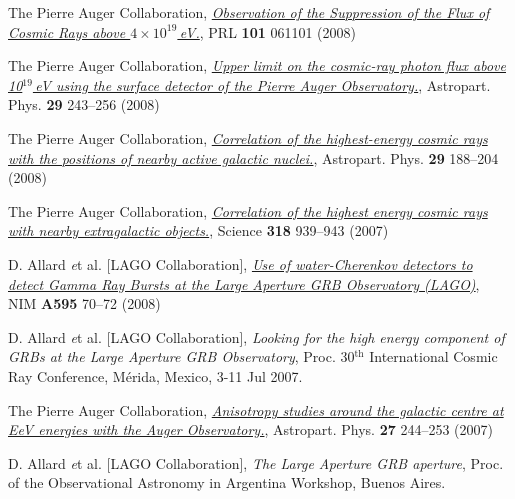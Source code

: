 \begin{etaremune}
\item {}The Pierre Auger Collaboration,
\href{http://dx.doi.org/10.1103/PhysRevLett.101.061101}{\emph{Observation of
the Suppression of the Flux of Cosmic Rays above $4\times10^{19}$\,eV.}}, PRL
{\bf 101} 061101 (2008)

\item {}The Pierre Auger Collaboration,
\href{http://dx.doi.org/10.1016/j.astropartphys.2008.01.003}{\emph{Upper limit
on the cosmic-ray photon flux above 10$^{19}$\,eV using the surface detector of
the Pierre Auger Observatory.}}, Astropart. Phys. {\bf 29} 243--256 (2008)

\item {}The Pierre Auger Collaboration,
\href{http://dx.doi.org/10.1016/j.astropartphys.2008.01.002}{\emph{Correlation
of the highest-energy cosmic rays with the positions of nearby active galactic
nuclei.}}, Astropart. Phys. {\bf 29} 188--204 (2008)

\item {}The Pierre Auger Collaboration,
\href{http://dx.doi.org/10.1126/science.1151124}{\emph{Correlation of the
highest energy cosmic rays with nearby extragalactic objects.}}, Science {\bf
318} 939--943 (2007)

\item {}D. Allard {\emph et al.} [LAGO Collaboration],
\href{http://dx.doi.org/10.1016/j.nima.2008.07.041}{\emph{Use of
water-Cherenkov detectors to detect Gamma Ray Bursts at the Large Aperture GRB
Observatory (LAGO)}}, NIM {\bf A595} 70--72 (2008)

\item {}D. Allard {\emph et al.} [LAGO Collaboration], {\emph{Looking for
the high energy component of GRBs at the Large Aperture GRB Observatory}}, \en
Proc. 30$^{\mathrm{th}}$ International Cosmic Ray Conference,  Mérida, Mexico, 3-11 Jul
2007.

\item {}The Pierre Auger Collaboration,
\href{http://dx.doi.org/10.1016/j.astropartphys.2006.11.002}{\emph{Anisotropy
studies around the galactic centre at EeV energies with the Auger
Observatory.}},  Astropart. Phys. {\bf 27} 244--253 (2007)

\item {}D. Allard {\emph et al.} [LAGO Collaboration], {\emph{The Large
Aperture GRB aperture}}, \en Proc. of the Observational Astronomy in Argentina
Workshop, Buenos Aires.

\end{etaremune}
